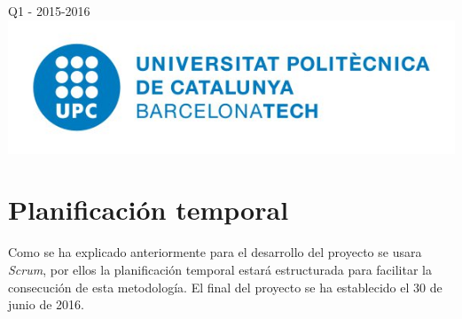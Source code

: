 \documentclass[12pt]{article} %
\begin{document}
\begin{titlepage}

{\large Q1 - 2015-2016}\\[2cm] %


\includegraphics[scale=0.7]{add/logo_upc.png}\\[1cm] %
 

\vfill %

\end{titlepage}


\tableofcontents %

\newpage %

\section{Planificación temporal}
Como se ha explicado anteriormente para el desarrollo del proyecto se usara \textit{Scrum}, por ellos la planificación temporal estará estructurada para facilitar la consecución de esta metodología. El final del proyecto se ha establecido el 30 de junio de 2016.
\end{document}
